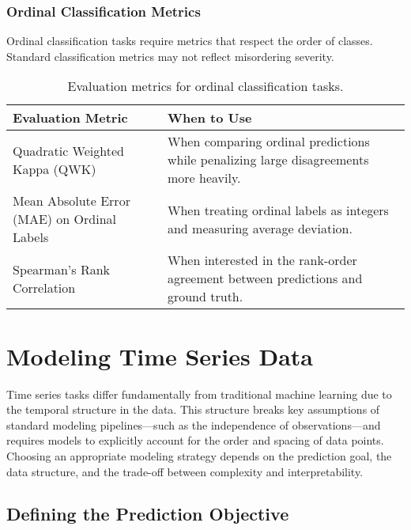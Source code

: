 \documentclass[12pt,openany]{book}
\begin{document}
\subsection{Ordinal Classification Metrics}

Ordinal classification tasks require metrics that respect the 
order of classes. Standard classification metrics may not reflect 
misordering severity.

\begin{table}[H]
    \centering
    \small
    \renewcommand{\arraystretch}{1.3}
    \begin{tabular}{|l|p{9cm}|}
        \hline
        \textbf{Evaluation Metric} & \textbf{When to Use} \\
        \hline
        Quadratic Weighted Kappa (QWK) & When comparing ordinal predictions while penalizing large disagreements more heavily. \\
        \hline
        Mean Absolute Error (MAE) on Ordinal Labels & When treating ordinal labels as integers and measuring average deviation. \\
        \hline
        Spearman's Rank Correlation & When interested in the rank-order agreement between predictions and ground truth. \\
        \hline
    \end{tabular}
    \caption{Evaluation metrics for ordinal classification tasks.}
\end{table}




\chapter{Modeling Time Series Data}

Time series tasks differ fundamentally from traditional machine learning due to the temporal structure in the data. This structure breaks key assumptions of standard modeling pipelines—such as the independence of observations—and requires models to explicitly account for the order and spacing of data points. Choosing an appropriate modeling strategy depends on the prediction goal, the data structure, and the trade-off between complexity and interpretability.



\section{Defining the Prediction Objective}
\end{document}

